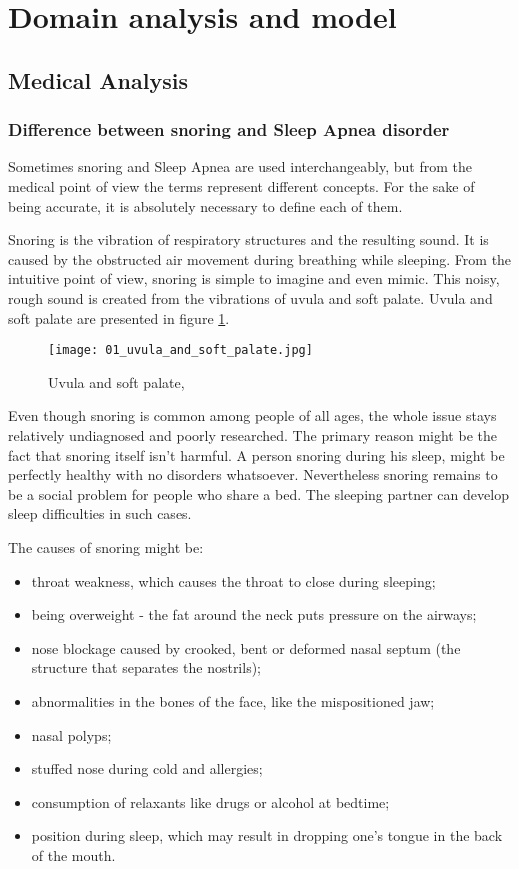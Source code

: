 \section{Domain analysis and model}\label{sec:domain}

\subsection{Medical Analysis}
\subsubsection{Difference between snoring and Sleep Apnea disorder}
Sometimes snoring and Sleep Apnea are used interchangeably, but from the medical point of view the terms represent different concepts. For the sake of being accurate, it is absolutely necessary to define each of them.

Snoring is the vibration of respiratory structures and the resulting sound. It is caused by the obstructed air movement during breathing while sleeping. From the intuitive point of view, snoring is simple to imagine and even mimic. This noisy, rough sound is created from the vibrations of uvula and soft palate. Uvula and soft palate are presented in figure \ref{fig:uvula_and_soft_palate}.

\begin{figure}[!ht]
\centering
\texttt{[image: 01\_uvula\_and\_soft\_palate.jpg]}
\caption{Uvula and soft palate, \cite{uvula}}
\label{fig:uvula_and_soft_palate}
\end{figure}

Even though snoring is common among people of all ages, the whole issue stays relatively undiagnosed and poorly researched. The primary reason might be the fact that snoring itself isn't harmful. A person snoring during his sleep, might be perfectly healthy with no disorders whatsoever. Nevertheless snoring remains to be a social problem for people who share a bed. The sleeping partner can develop sleep difficulties in such cases.

The causes of snoring might be:
\begin{itemize}[topsep=5pt, partopsep=0pt,itemsep=3pt,parsep=1pt]
 \item throat weakness, which causes the throat to close during sleeping;
 \item being overweight - the fat around the neck puts pressure on the airways;
 \item nose blockage caused by crooked, bent or deformed nasal septum (the structure that separates the nostrils);
 \item abnormalities in the bones of the face, like the mispositioned jaw;
 \item nasal polyps;
 \item stuffed nose during cold and allergies;
 \item consumption of relaxants like drugs or alcohol at bedtime;
 \item position during sleep, which may result in dropping one's tongue in the back of the mouth.
\end{itemize}

